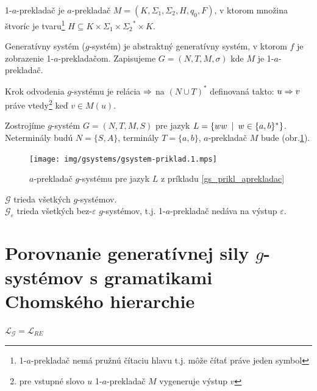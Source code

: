 \begin{definicia}
  1-$a$-prekladač je $a$-prekladač
  $M=(K,\Sigma_1,\Sigma_2,H,q_0,F)$, v ktorom množina štvoríc je
  tvaru\footnote{1-$a$-prekladač nemá pružnú čítaciu hlavu t.j. môže
  čítať práve jeden symbol} $H\subseteq K\times\Sigma_1\times
  {\Sigma_2}^* \times K$.
\end{definicia}

\begin{definicia}
  Generatívny systém ($g$-systém) je abstraktný generatívny systém,
  v ktorom $f$ je zobrazenie 1-$a$-prekladačom. Zapisujeme
  $G=(N,T,M,\sigma)$ kde $M$ je 1-$a$-prekladač.
\end{definicia}

\begin{definicia}
  Krok odvodenia $g$-systému je relácia $\Rightarrow$ na $(N\cup T)^* $
  definovaná takto: $u\Rightarrow v$ práve vtedy\footnote{pre vstupné slovo
  $u$ 1-$a$-prekladač $M$ vygeneruje výstup $v$} keď $v\in M(u)$.
\end{definicia}

\begin{priklad}
  \label{gs_prikl_aprekladac} Zostrojíme $g$-systém  $G=(N,T,M,S)$ pre jazyk
  $L=\{ww\enspace |\enspace w\in\{a,b\}^*\}$. Neterminály budú $N=\{S,A\}$,
  terminály $T=\{a,b\}$, $a$-prekladač $M$ bude (obr.\ref{fig:gsystem-priklad}).
  \begin{figure}[!ht]
    \centering
    \texttt{[image: img/gsystems/gsystem-priklad.1.mps]}
    \caption{$a$-prekladač $g$-systému pre jazyk $L$ z príkladu
      \ref{gs_prikl_aprekladac}}
    \label{fig:gsystem-priklad}
  \end{figure}
\end{priklad}

\begin{oznacenie}
  $\mathcal{G}$  trieda všetkých $g$-systémov. \\
  $\mathcal{G_\varepsilon}$ trieda všetkých bez-$\varepsilon$
  $g$-systémov, t.j. 1-$a$-prekladač nedáva na výstup $\varepsilon$.
\end{oznacenie}

\section{Porovnanie generatívnej sily $g$-systémov s gramatikami Chomského hierarchie}

\begin{veta}
  \label{gs_veta_gre} $\mathcal{L}_{\mathcal{G}}=\mathcal{L}_{RE}$
\end{veta}

